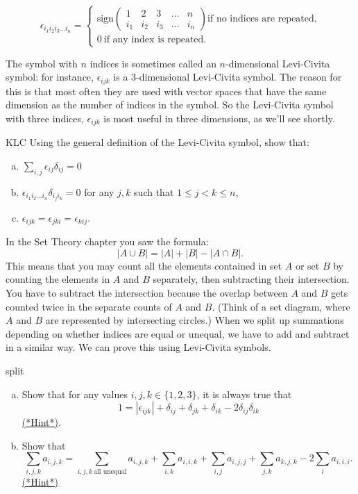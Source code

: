 \[ \epsilon_{i_1 i_2 i_3 \ldots i_n}=
\begin{cases}
\text{sign} \left( \begin{smallmatrix} 1&2&3&\ldots&n \\ i_1&i_2&i_3 &\ldots&i_n \end{smallmatrix} \right) \text{if no indices are repeated,}\\
0 ~ \text{if any  index is repeated.}
\end{cases} \]

The symbol with $n$ indices is sometimes called an $n$-dimensional Levi-Civita symbol: for instance, $\epsilon_{ijk}$ is a 3-dimensional Levi-Civita symbol.  The reason for this is that most often they are used with vector spaces that have the same dimension as the number of indices in the symbol.  So   the Levi-Civita symbol with three indices, $\epsilon_{ijk}$ is most useful in three dimensions, as we'll see shortly.

\begin{exercise}{KLC}
Using  the general definition of the Levi-Civita symbol, show that:
\begin{enumerate}[(a)]
\item
$\displaystyle \sum_{i,j} \epsilon_{ij} \delta_{ij}=0$
\item
$ \epsilon_{i_1i_2\ldots i_n} \delta_{i_ji_k}=0$ for any $j,k$ such that $1 \le j < k \le n$,
\item
$\epsilon_{ijk} = \epsilon_{jki} = \epsilon_{kij}.$
\end{enumerate}
\end{exercise}

In the Set Theory chapter you saw the formula:
\[ |A \cup B| = |A| + |B| - |A \cap B|.\]
This means that you may count all the elements contained in set $A$ or set $B$ by counting the elements in $A$ and $B$ separately, then subtracting their intersection.  You have to  subtract the intersection because  the overlap between $A$ and $B$ gets counted twice in the separate counts of $A$ and $B$.  (Think of a set diagram, where $A$ and $B$ are represented by intersecting circles.)  When we split up summations depending on whether indices are equal or unequal, we have to add and subtract in a similar way. We can prove this using Levi-Civita symbols.
  
\begin{exercise}{split}
\begin{enumerate}[(a)]
\item
Show that for any values $i,j,k \in \{1,2,3\}$, it is always true that 
\[ 1=|\epsilon_{ijk}|+\delta_{ij}+\delta_{jk}+\delta_{ik}-2\delta_{ij}\delta_{ik}\]
 \hyperref[sec:SigmaNotation:Hints]{(*Hint*)}.   
\item
Show that 
\[
\sum_{i,j,k} a_{i,j,k}=\sum_{i,j,k~\text{all unequal}}a_{i,j,k}+\sum_{i,k}a_{i,i,k}+\sum_{i,j}a_{i,j,j}+\sum_{j,k}a_{k,j,k}-2\sum_{i}a_{i,i,i}.
\]
\hyperref[sec:SigmaNotation:Hints]{(*Hint*)} 
\end{enumerate}
\end{exercise}


